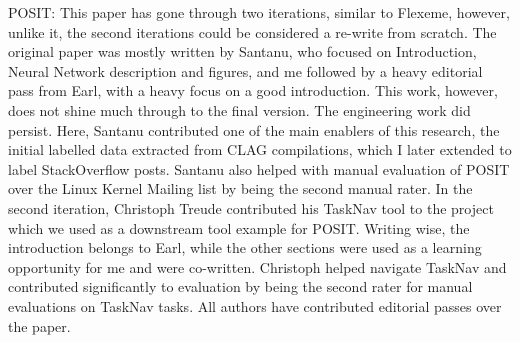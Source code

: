 \begin{acknowledgements}
POSIT: This paper has gone through two iterations, similar to Flexeme, however,
unlike it, the second iterations could be considered a re-write from scratch.
The original paper was mostly written by Santanu, who focused on Introduction,
Neural Network description and figures, and me followed by a heavy editorial
pass from Earl, with a heavy focus on a good introduction. This work, however,
does not shine much through to the final version. The engineering work did
persist. Here, Santanu contributed one of the main enablers of this research,
the initial labelled data extracted from CLAG compilations, which I later
extended to label StackOverflow posts. Santanu also helped with manual
evaluation of POSIT over the Linux Kernel Mailing list by being the second
manual rater. In the second iteration, Christoph Treude contributed his TaskNav
tool to the project which we used as a downstream tool example for POSIT.
Writing wise, the introduction belongs to Earl, while the other sections were
used as a learning opportunity for me and were co-written. Christoph helped
navigate TaskNav and contributed significantly to evaluation by being the second
rater for manual evaluations on TaskNav tasks. All authors have contributed
editorial passes over the paper.


\end{acknowledgements}

\setcounter{tocdepth}{2} 

\tableofcontents
\listoffigures
\listoftables
{}


